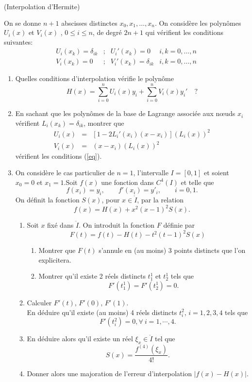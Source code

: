 \documentclass[a4paper,12pt,reqno]{amsart}
\begin{document}
\begin{exo} (Interpolation d'Hermite)

  On se donne $n+1$ abscisses distinctes $x_0, x_1, \ldots , x_n$.
  On considère les polynômes $U_i(x)$ et $V_i(x)$ , $0\leq i\leq n$, de degré $2n+1$ qui vérifient les conditions suivantes:
  \begin{equation}\label{eq}
    \begin{array}{lcll}
      U_i(x_k)=\delta_{ik} & ; & U_i'(x_k)=0           & i,k=0,\ldots,n\\
      V_i(x_k)=0           & ; & V_i'(x_k)=\delta_{ik} & i,k=0,\ldots,n
    \end{array}
  \end{equation}
  \begin{enumerate}
    \item Quelles conditions d'interpolation vérifie le polynôme
      $$
        H(x)=\sum_{i=0}^n U_i(x)y_i +\sum_{i=0}^nV_i(x)y_i'\quad ?
      $$
    \item En sachant que les polynômes de la base de Lagrange associée aux nœuds $x_i$ vérifient $L_i(x_k)=\delta_{ik}$, montrer que
      \begin{eqnarray*}
        U_i(x) &=& \left[ 1-2L_i'(x_i)(x-x_i)\right](L_i(x))^2\\
        V_i(x) &=& (x-x_i)(L_i(x))^2
      \end{eqnarray*}
    vérifient les conditions (\ref{eq}).
    \item On considère le cas particulier de $n=1$, l'intervalle $I=[0,1]$ et soient $x_0=0$ et $x_1=1$.Soit $f(x)$ une fonction dans $C^4(I)$ et telle que
      $$
        f(x_i)=y_i, \qquad  f'(x_i)=y'_i, \qquad i=0,1.
      $$
    On définit la fonction $S(x)$, pour $x \in \mathring{I}$, par la relation
      $$
        f(x)=H(x)+x^2(x-1)^2S(x).
      $$
    \begin{enumerate}
      \item Soit $x$ fixé dans $\mathring{I}$. On introduit la fonction $F$ définie par
        $$
          F(t)=f(t)-H(t)-t^2(t-1)^2S(x)
        $$
      \begin{enumerate}
        \item Montrer que $F(t)$ s'annule en (au moins) 3 points distincts que l'on explicitera.
        \item Montrer qu'il existe 2 réels distincts $t^1_1$ et $t^1_2$ tels que
          $$
            F'(t^1_1)=F'(t^1_2)=0.
          $$
      \end{enumerate}
      \item Calculer $F'(t)$, $F'(0)$, $F'(1)$.\\
      En déduire qu'il existe (au moins) 4 réels distincts $t^2_i$, $i=1,2,3,4$ tels que
        $$
          F'(t^2_i)=0, \forall  \ i=1, \cdots , 4.
        $$
      \item En déduire alors qu'il existe un réel $\xi_x \in \mathring{I}$ tel que
        $$
          S(x)=\frac{f^{(4)}(\xi_x)}{4!}.
        $$
      \item Donner alors une majoration de l'erreur d'interpolation $|f(x)-H(x)|$.\\
    \end{enumerate}


\end{enumerate}
\end{exo}
\end{document}
